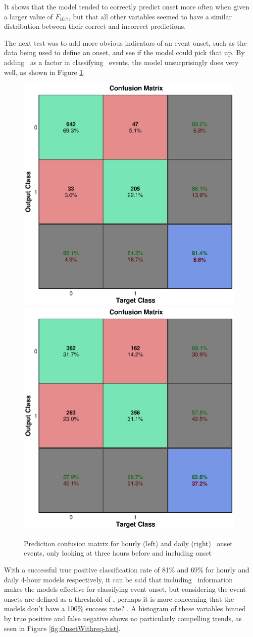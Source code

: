 It shows that the model tended to correctly predict onset more often when given a larger value of $F_{10.7}$, but that all other variables seemed to have a similar distribution between their correct and incorrect predictions. 

The next test was to add more obvious indicators of an event onset, such as the data being used to define an onset, and see if the model could pick that up. By adding \req\ as a factor in classifying \req\ events, the model unsurprisingly does very well, as shown in Figure \ref{fig:OnsetWithreq}.

\begin{figure}[htp!]
	\centering
	\includegraphics[width=0.45\linewidth]{Figures/CH5/NNBinaryOnset-hourly-withreq.eps}
	\includegraphics[width=0.45\linewidth]{Figures/CH5/NNBinaryOnset-daily-withreq.eps}
	\caption{Prediction confusion matrix for hourly (left) and daily (right) \req\ onset events, only looking at three hours before and including onset}
	\label{fig:OnsetWithreq}
\end{figure}

With a successful true positive classification rate of 81\% and 69\% for hourly and daily 4-hour models respectively, it can be said that including \req\ information makes the models effective for classifying event onset, but considering the event onsets are defined as a threshold of \req, perhaps it is more concerning that the models don't have a 100\% success rate? . A histogram of these variables binned by true positive and false negative shows no particularly compelling trends, as seen in Figure \ref{fig:OnsetWithreq-hist}.


